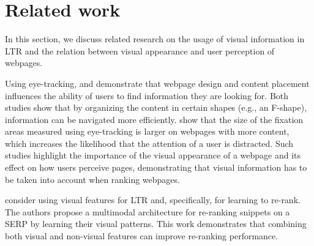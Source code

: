 
\section{Related work}
\label{sec:relatedwork}


In this section, we discuss related research on the usage of visual information in \ac{LTR} and the relation between visual appearance and user perception of webpages.


Using eye-tracking, \citet{nielsen2006f} and \citet{pernice2017f} demonstrate that webpage design and content placement influences the ability of users to find information they are looking for. 
Both studies show that by organizing the content in certain shapes (e.g., an F-shape), information can be navigated more efficiently.
\citet{wang2014eye} show that the size of the fixation areas measured using eye-tracking is larger on webpages with more content, which increases the likelihood that the attention of a user is distracted.
Such studies highlight the importance of the visual appearance of a webpage and its effect on how users perceive pages, demonstrating that visual information has to be taken into account when ranking webpages.

\citet{zhang2018relevance} consider using visual features for \ac{LTR} and, specifically, for learning to re-rank.
The authors propose a multimodal architecture for re-ranking snippets on a \ac{SERP} by learning their visual patterns.
This work demonstrates that combining both visual and non-visual features can improve re-ranking performance.

